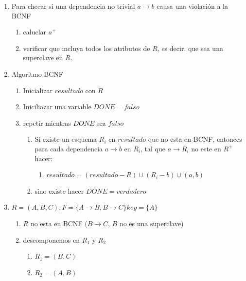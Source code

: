 \documentclass[twoside]{article}
\begin{document}
\begin{enumerate}
\begin{enumerate}
            \end{enumerate}
      \item Para checar si una dependencia no trivial $a \rightarrow b$ causa una violación a la BCNF
            \begin{enumerate}
                  \item caluclar $a^+$
                  \item verificar que incluya todos los atributos de $R$, es decir, que sea una superclave en $R$.
            \end{enumerate}
      \item Algoritmo BCNF
            \begin{enumerate}
                  \item Inicializar $resultado$ con $R$
                  \item Iniciliazar una variable $DONE = falso$
                  \item repetir mientras $DONE$ sea $falso$
                        \begin{enumerate}
                              \item Si existe un esquema $R_i$ en $resultado$ que no esta en BCNF, entonces para cada dependencia $a \rightarrow b$ en $R_i$, tal que $a \rightarrow R_i$ no este en $R^+$ hacer:
                                    \begin{enumerate}
                                          \item $resultado = (resultado - R) \cup (R_i - b) \cup (a, b)$
                                    \end{enumerate}
                              \item sino existe hacer $DONE = verdadero$
                        \end{enumerate}
            \end{enumerate}
      \item $R = (A, B, C), F = \{ A \rightarrow B, B \rightarrow C \} key = \{A\}$
            \begin{enumerate}
                  \item $R$ no esta en BCNF ($B \rightarrow C$, $B$ no es una superclave)
                  \item descomponemos en $R_1$ y $R_2$
                        \begin{enumerate}
                              \item $R_1 = (B, C)$
                              \item $R_2 = (A, B)$

\end{enumerate}
\end{enumerate}
\end{enumerate}
\end{document}
